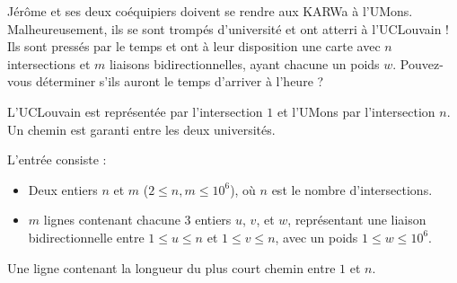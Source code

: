 \problemname{\problemyamlname}



Jérôme et ses deux coéquipiers doivent se rendre aux KARWa à l'UMons.
Malheureusement, ils se sont trompés d'université et ont atterri à l'UCLouvain !
Ils sont pressés par le temps et ont à leur disposition une carte avec $n$ intersections et $m$ liaisons bidirectionnelles, ayant chacune un poids $w$.
Pouvez-vous déterminer s'ils auront le temps d'arriver à l'heure ?

L'UCLouvain est représentée par l'intersection $1$ et l'UMons par l'intersection $n$.
Un chemin est garanti entre les deux universités.

\begin{Input}
	L'entrée consiste :
	\begin{itemize}
		\item Deux entiers $n$ et $m$ ($2 \le n, m \le 10^6$), où $n$ est le nombre d'intersections.
		\item $m$ lignes contenant chacune 3 entiers $u$, $v$, et $w$, représentant une liaison bidirectionnelle entre $1 \le u \le n$ et $1 \le v \le n$, avec un poids $1 \le w \le 10^6$.
	\end{itemize}
\end{Input}

\begin{Output}
	Une ligne contenant la longueur du plus court chemin entre $1$ et $n$.
\end{Output}
